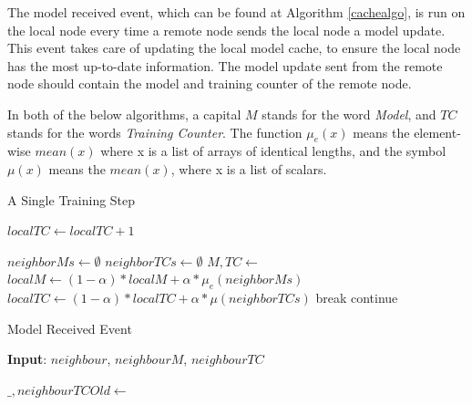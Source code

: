 \documentclass[letterpaper, 10 pt, conference]{ieeeconf}  %
\begin{document}
The model received event, which can be found at Algorithm \ref{cachealgo}, is run on the local node every time a remote node sends the local node a model update. This event takes care of updating the local model cache, to ensure the local node has the most up-to-date information. The model update sent from the remote node should contain the model and training counter of the remote node.

In both of the below algorithms, a capital $M$ stands for the word \emph{Model}, and $TC$ stands for the words \emph{Training Counter}. The function $\mu_e(x)$ means the element-wise $mean(x)$ where x is a list of arrays of identical lengths, and the symbol $\mu(x)$ means the $mean(x)$, where x is a list of scalars.

\begin{algorithm}[H]
	\caption{A Single Training Step} \label{updatealgo}
	\label{mainalgo}
	\begin{algorithmic}[1]
		\State {}
		\State $localTC \gets localTC + 1$
		\State {}
		\EndFor
		
		\State $neighborMs \gets \emptyset$
		\State $neighborTCs \gets \emptyset$
		\State $M, TC \gets$ 
		\State {}
		\State {}
		\EndIf
		\EndFor
		\State $localM \gets (1 - \alpha) * localM + \alpha * \mu_e(neighborMs)$ \label{updatelm}
		\State $localTC \gets (1 - \alpha) * localTC + \alpha * \mu(neighborTCs)$ \label{updatetc}
		\State break
		\Else
		\State {}
		\State continue
		\EndIf
		\EndFor
	\end{algorithmic}
\end{algorithm}

\begin{algorithm}[H]
	\caption{Model Received Event} \label{cachealgo}
	\textbf{Input}: $neighbour$, $neighbourM$, $neighbourTC$
	\newline
	\begin{algorithmic}[1]
		\State $\_, neighbourTCOld \gets$ 
		\State {}
		\EndIf
		\Else
		\State {}
		\EndIf
	\end{algorithmic}
\end{algorithm}
\end{document}
